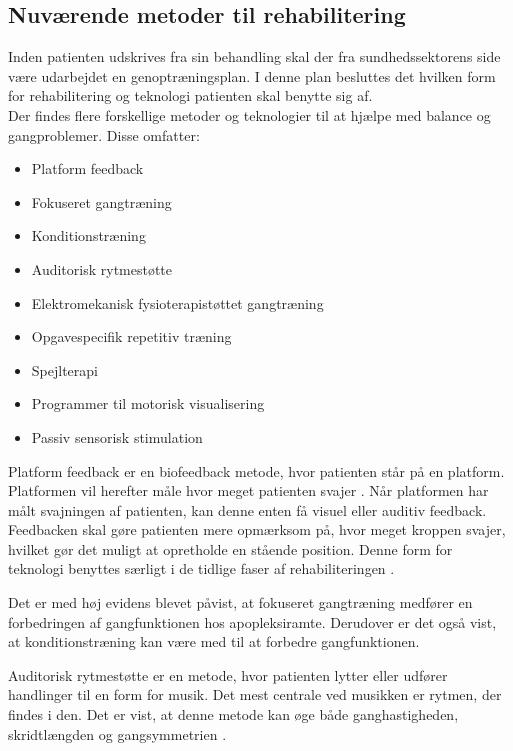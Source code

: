 \subsection{Nuværende metoder til rehabilitering}

Inden patienten udskrives fra sin behandling skal der fra sundhedssektorens side være udarbejdet en genoptræningsplan. I denne plan besluttes det hvilken form for rehabilitering og teknologi patienten skal benytte sig af. \cite{Sundhedsstyrelsen2011a} \\
Der findes flere forskellige metoder og teknologier til at hjælpe med balance og gangproblemer. Disse omfatter: \cite{Sundhedsstyrelsen2011a}  

\begin{itemize}
\item Platform feedback
\item Fokuseret gangtræning
\item Konditionstræning
\item Auditorisk rytmestøtte
\item Elektromekanisk fysioterapistøttet gangtræning
\item Opgavespecifik repetitiv træning
\item Spejlterapi
\item Programmer til motorisk visualisering
\item Passiv sensorisk stimulation
\end{itemize}

Platform feedback er en biofeedback metode, hvor patienten står på en platform. Platformen vil herefter måle hvor meget patienten svajer . Når platformen har målt svajningen af patienten, kan denne enten få visuel eller auditiv feedback. Feedbacken skal gøre patienten mere opmærksom på, hvor meget kroppen svajer, hvilket gør det muligt at opretholde en stående position. \cite{Barclay-Goddard2004}
Denne form for teknologi benyttes særligt i de tidlige faser af rehabiliteringen \cite{Sundhedsstyrelsen2011a}. 

Det er med høj evidens blevet påvist, at fokuseret gangtræning medfører en forbedringen af gangfunktionen hos apopleksiramte\cite{Sundhedsstyrelsen2010}. Derudover er det også vist, at konditionstræning kan være med til at forbedre gangfunktionen\cite{Sundhedsstyrelsen2010}.

Auditorisk rytmestøtte er en metode, hvor patienten lytter eller udfører handlinger til en form for musik. Det mest centrale ved musikken er rytmen, der findes i den. \cite{Bradt2010} Det er vist, at denne metode kan øge både ganghastigheden, skridtlængden og gangsymmetrien \cite{Sundhedsstyrelsen2010}.

